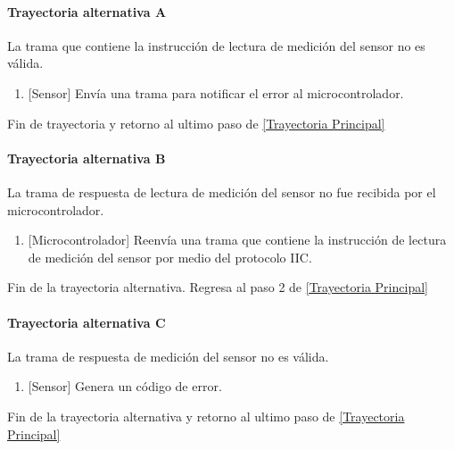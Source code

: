 \paragraph{Trayectoria alternativa A} \label{SUB-M-CU1.1:TA}
	La trama que contiene la instrucción de lectura de medición del sensor no es válida.
	\begin{enumerate}[label=A\arabic*.]
		\item {[Sensor]} Envía una trama para notificar el error al microcontrolador.  
	\end{enumerate}
	Fin de trayectoria y retorno al ultimo paso de \hyperref[SUB-M-CU1.1:TP]{[Trayectoria Principal]}  

\paragraph{Trayectoria alternativa B} \label{SUB-M-CU1.1:TB}
	La trama de respuesta de lectura de medición del sensor no fue recibida por el microcontrolador.
	\begin{enumerate}[label=B\arabic*.]
		\item {[Microcontrolador]} Reenvía una trama que contiene la instrucción de lectura de medición del sensor por medio del protocolo IIC.  
	\end{enumerate}
	Fin de la trayectoria alternativa. Regresa al paso 2 de \hyperref[SUB-M-CU1.1:TP]{[Trayectoria Principal]}  
	
\paragraph{Trayectoria alternativa C} \label{SUB-M-CU1.1:TC}
	La trama de respuesta de medición del sensor no es válida.
	\begin{enumerate}[label=C\arabic*.]
		\item {[Sensor]} Genera un código de error.
	\end{enumerate}
	Fin de la trayectoria alternativa y retorno al ultimo paso de \hyperref[SUB-M-CU1.1:TP]{[Trayectoria Principal]} 
